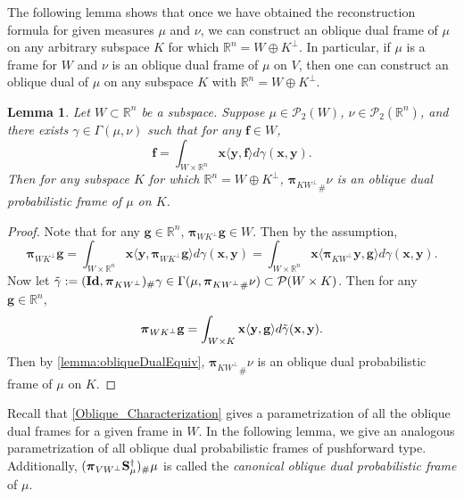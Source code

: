 \documentclass{amsart}
\numberwithin{equation}{section}
\newcommand{\bpi}{{\boldsymbol{\pi}}}
\theoremstyle{plain}
\newtheorem{lemma}[theorem]{Lemma}
\theoremstyle{remark}
\theoremstyle{definition}
\begin{document}
The following lemma shows that once we have obtained the reconstruction formula for given measures $\mu$ and $\nu$, we can construct an oblique dual frame of $\mu$ on any arbitrary subspace $K$ for which $\mathbb{R}^n = W \oplus K^\perp$. In particular, if $\mu$ is a frame for $W$ and $\nu$ is an oblique dual frame of $\mu$ on $V$, then one can construct an oblique dual of $\mu$ on any subspace $K$ with $\mathbb{R}^n = W \oplus K^\perp$.
\begin{lemma}
   Let $W \subset \mathbb{R}^n$ be a subspace. Suppose $\mu \in \mathcal{P}_2(W)$, $\nu \in \mathcal{P}_2(\mathbb{R}^n)$, and there exists $\gamma \in \Gamma(\mu, \nu)$ such that for any $\mathbf{f} \in W$, 
 \begin{equation*}
        \mathbf{f} = \int_{W \times \mathbb{R}^n} \mathbf{x} \langle \mathbf{y}, \mathbf{f} \rangle d\gamma(\mathbf{x}, \mathbf{y}).
    \end{equation*}
Then for any subspace $K$ for which $\mathbb{R}^n = W \oplus K^\perp$, ${\bpi_{KW^\perp}}_{\#}\nu$ is an oblique dual probabilistic frame of $\mu$ on $K$. 
\end{lemma}

\begin{proof}
 Note that for any $\mathbf{g} \in \mathbb{R}^n$, $ \bpi_{WK^\perp}\mathbf{g} \in W$. Then by the assumption,
\begin{equation*}
        \bpi_{WK^\perp}\mathbf{g} = \int_{W \times \mathbb{R}^n} \mathbf{x} \langle \mathbf{y}, \bpi_{WK^\perp}\mathbf{g} \rangle d\gamma(\mathbf{x}, \mathbf{y}) = \int_{W \times \mathbb{R}^n} \mathbf{x} \langle \bpi_{KW^\perp}\mathbf{y}, \mathbf{g} \rangle d\gamma(\mathbf{x}, \mathbf{y}).
    \end{equation*}
    Now let $\Tilde{\gamma}:= (\mathbf{Id}, \bpi_{KW^\perp})_\#\gamma \in \Gamma(\mu, {\bpi_{KW^\perp}}_{\#}\nu) \subset \mathcal{P}(W \times K)$. Then for any $\mathbf{g} \in \mathbb{R}^n$, 
    \begin{equation*}
        \bpi_{WK^\perp}\mathbf{g} = \int_{W \times K} \mathbf{x} \langle \mathbf{y}, \mathbf{g} \rangle d\Tilde{\gamma}(\mathbf{x}, \mathbf{y}).
    \end{equation*}
    Then by \cref{lemma:obliqueDualEquiv}, ${\bpi_{KW^\perp}}_{\#}\nu$ is an oblique dual probabilistic frame of $\mu$ on $K$. 
\end{proof}




Recall that \cref{Oblique_Characterization} gives a parametrization of all the oblique dual frames for a given frame in $W$. In the following lemma, we give an analogous parametrization of all oblique dual probabilistic frames of pushforward type. Additionally, $(\bpi_{VW^\perp}{\bf S}_\mu^{\dagger})_\#\mu$ is called the \emph{canonical oblique dual probabilistic frame} of $\mu$. 
\end{document}
